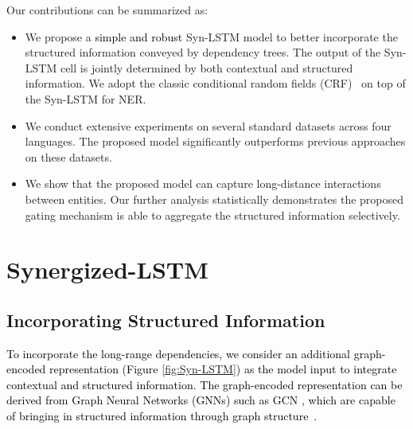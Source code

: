 \documentclass[11pt]{article}
\begin{document}
Our contributions can be summarized as:
\begin{itemize}
    \item We propose a \textcolor{black}{simple and robust} Syn-LSTM model to better incorporate the structured information conveyed by dependency trees.
    The output of the Syn-LSTM cell is jointly determined by both contextual  and structured information.
We adopt the classic conditional random fields (CRF)~\cite{lafferty2001conditional} on top of the Syn-LSTM for NER.
    
    \item We conduct extensive experiments on several standard datasets across four languages.
    The proposed model significantly outperforms previous approaches on these datasets. 


    \item We show that the proposed model can capture long-distance interactions between entities. 
    Our further analysis  statistically demonstrates the proposed gating mechanism is able to aggregate the structured information selectively. 
\end{itemize}
















\section{Synergized-LSTM}



\subsection{Incorporating Structured Information}
\textcolor{black}{
To incorporate the long-range dependencies, we consider an additional graph-encoded representation  (Figure \ref{fig:Syn-LSTM}) as the model input to integrate  contextual and structured information. 
The graph-encoded representation  can be derived from Graph Neural Networks (GNNs) such as GCN \cite{kipf2017semi}, which are capable of bringing in structured information through graph structure~\cite{Hamilton2017RepresentationLO}.
}
\end{document}
